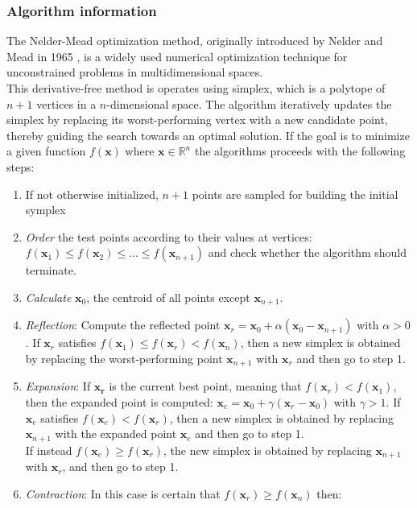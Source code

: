 \subsubsection{Algorithm information}
The Nelder-Mead optimization method, originally introduced by Nelder and Mead in 1965 \cite{NelderMeads}, is a widely used numerical optimization technique for unconstrained problems in multidimensional spaces. \\
This derivative-free method is operates using simplex, which is a polytope of $n+1$ vertices in a $n$-dimensional space.
The algorithm iteratively updates the simplex by replacing its worst-performing vertex with a new candidate point, thereby guiding the search towards an optimal solution. 
If the goal is to minimize a given function $f(\mathbf{x})$ where $\mathbf{x} \in \mathbb{R}^n$ the algorithms proceeds with the following steps:\begin{enumerate}
    \item If not otherwise initialized, $n+1$ points are sampled for building the initial symplex
    \item \textit{Order} the test points according to their values at vertices: $f(\mathbf{x}_1) \leq f(\mathbf{x}_2) \leq \dots \leq f(\mathbf{x}_{n+1})$ and check whether the algorithm should terminate.
    \item \textit{Calculate} $\mathbf{x}_0$, the centroid of all points except $\mathbf{x}_{n+1}$.
    \item \textit{Reflection}: Compute the reflected point $\mathbf{x}_r = \mathbf{x}_0 + \alpha(\mathbf{x}_0 - \mathbf{x}_{n+1})$ with $\alpha > 0$. 
            If $\mathbf{x}_r$ satisfies $f(\mathbf{x}_1) \leq f(\mathbf{x}_r) < f(\mathbf{x}_n)$, then a new simplex is obtained by replacing the worst-performing point $\mathbf{x}_{n+1}$ with $\mathbf{x}_r$ and then go to step 1.
    \item \textit{Expansion}: If $\mathbf{x_r}$ is the current best point, meaning that $f(\mathbf{x}_r) < f(\mathbf{x}_1)$, then the expanded point is computed: $\mathbf{x}_e = \mathbf{x}_0 + \gamma(\mathbf{x}_r-\mathbf{x}_0)$ with $\gamma>1$.
           If $\mathbf{x}_e$ satisfies $f(\mathbf{x}_e) < f(\mathbf{x}_r)$, then a new simplex is obtained by replacing $\mathbf{x}_{n+1}$ with the expanded point $\mathbf{x}_e$ and then go to step 1.\\
            If instead $f(\mathbf{x}_e) \geq f(\mathbf{x}_r)$, the new simplex is obtained by replacing $\mathbf{x}_{n+1}$ with $\mathbf{x}_r$, and then go to step 1.
    \item \textit{Contraction}: In this case is certain that $f(\mathbf{x}_r) \geq f(\mathbf{x}_n)$ then:\begin{itemize}

\end{itemize}
\end{enumerate}

